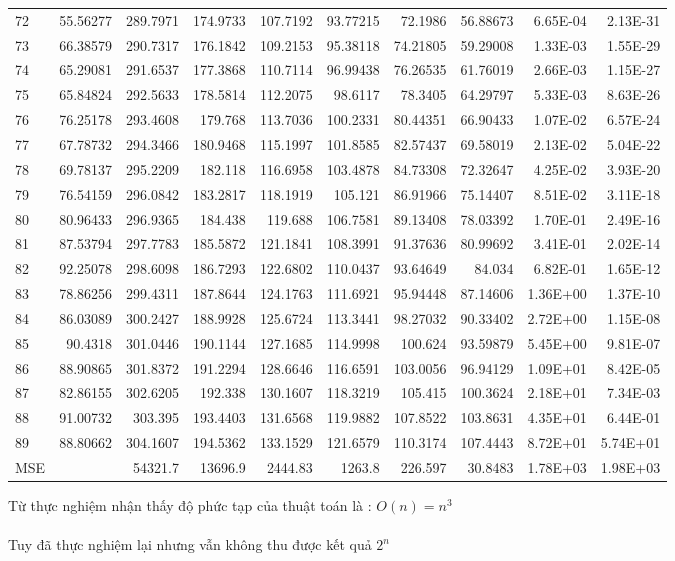 \documentclass[a4paper]{article}
\begin{document}
{\begin{tabular}{|l|r|r|r|r|r|r|r|r|r|}
    {72} & 55.56277 & 289.7971 & 174.9733 & 107.7192 & 93.77215 & 72.1986 & 56.88673 & 6.65E-04 & 2.13E-31 \\
    {73} & 66.38579 & 290.7317 & 176.1842 & 109.2153 & 95.38118 & 74.21805 & 59.29008 & 1.33E-03 & 1.55E-29 \\
    {74} & 65.29081 & 291.6537 & 177.3868 & 110.7114 & 96.99438 & 76.26535 & 61.76019 & 2.66E-03 & 1.15E-27 \\
    {75} & 65.84824 & 292.5633 & 178.5814 & 112.2075 & 98.6117 & 78.3405 & 64.29797 & 5.33E-03 & 8.63E-26 \\
    {76} & 76.25178 & 293.4608 & 179.768 & 113.7036 & 100.2331 & 80.44351 & 66.90433 & 1.07E-02 & 6.57E-24 \\
    {77} & 67.78732 & 294.3466 & 180.9468 & 115.1997 & 101.8585 & 82.57437 & 69.58019 & 2.13E-02 & 5.04E-22 \\
    {78} & 69.78137 & 295.2209 & 182.118 & 116.6958 & 103.4878 & 84.73308 & 72.32647 & 4.25E-02 & 3.93E-20 \\
    {79} & 76.54159 & 296.0842 & 183.2817 & 118.1919 & 105.121 & 86.91966 & 75.14407 & 8.51E-02 & 3.11E-18 \\
    {80} & 80.96433 & 296.9365 & 184.438 & 119.688 & 106.7581 & 89.13408 & 78.03392 & 1.70E-01 & 2.49E-16 \\
    {81} & 87.53794 & 297.7783 & 185.5872 & 121.1841 & 108.3991 & 91.37636 & 80.99692 & 3.41E-01 & 2.02E-14 \\
    {82} & 92.25078 & 298.6098 & 186.7293 & 122.6802 & 110.0437 & 93.64649 & 84.034 & 6.82E-01 & 1.65E-12 \\
    {83} & 78.86256 & 299.4311 & 187.8644 & 124.1763 & 111.6921 & 95.94448 & 87.14606 & 1.36E+00 & 1.37E-10 \\
    {84} & 86.03089 & 300.2427 & 188.9928 & 125.6724 & 113.3441 & 98.27032 & 90.33402 & 2.72E+00 & 1.15E-08 \\
    {85} & 90.4318 & 301.0446 & 190.1144 & 127.1685 & 114.9998 & 100.624 & 93.59879 & 5.45E+00 & 9.81E-07 \\
    {86} & 88.90865 & 301.8372 & 191.2294 & 128.6646 & 116.6591 & 103.0056 & 96.94129 & 1.09E+01 & 8.42E-05 \\
    {87} & 82.86155 & 302.6205 & 192.338 & 130.1607 & 118.3219 & 105.415 & 100.3624 & 2.18E+01 & 7.34E-03 \\
    {88} & 91.00732 & 303.395 & 193.4403 & 131.6568 & 119.9882 & 107.8522 & 103.8631 & 4.35E+01 & 6.44E-01 \\
    {89} & 88.80662 & 304.1607 & 194.5362 & 133.1529 & 121.6579 & 110.3174 & 107.4443 & 8.72E+01 & 5.74E+01 \\
    MSE   &       & 54321.7 & 13696.9 & 2444.83 & 1263.8 & 226.597 & 30.8483 & 1.78E+03 & 1.98E+03 \\
    \hline
\end{tabular}}
\newpage
Từ thực nghiệm nhận thấy độ phức tạp của thuật toán là : $ O(n) = n^3$\\ \\
Tuy đã thực nghiệm lại nhưng vẫn không thu được kết quả $2^n$
\end{document}
